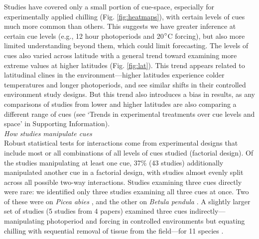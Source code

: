 \documentclass[11pt,letter]{article}
\newcommand{\R}[1]{\label{#1}\linelabel{#1}}
\begin{document}
Studies have covered only a small portion of cue-space, especially for experimentally applied chilling (Fig. \ref{fig:heatmaps}), with certain levels of cues much more common than others. This suggests we have greater inference at certain cue levels (e.g., 12 hour photoperiods and 20$\degree$C forcing), but also more limited understanding beyond them, which could limit forecasting. The levels of cues also varied across latitude with a general trend toward examining more extreme values at higher latitudes (Fig. \ref{fig:lat}). This trend appears related to latitudinal clines in the environment---higher latitudes experience colder temperatures and longer photoperiods, and see similar shifts in their controlled environment study designs. But this trend also introduces a bias in results, as any comparisons of studies from lower and higher latitudes are also comparing a different range of cues (see `Trends in experimental treatments over cue levels and space' in Supporting Information). \\

\emph{How studies manipulate cues}\\ %
\R{R2comm}Robust statistical tests for interactions come from experimental designs that include most or all combinations of all levels of cues studied (factorial design). Of the studies manipulating at least one cue, 37\%  (43 studies) additionally manipulated another cue in a factorial design, with studies almost evenly split across all possible two-way interactions. Studies examining three cues directly were rare: we identified only three studies examining all three cues at once. Two of these were on \emph{Picea abies} \citep{Worrall:1967aa,Sogaard:2008aa}, and the other on \emph{Betula pendula} \citep{Skuterud:1994aa}. A slightly larger set of studies (5 studies from 4 papers) examined three cues indirectly---manipulating photoperiod and forcing in controlled environments but equating chilling with sequential removal of tissue from the field---for 11 species \citep{Schnabel:1987aa,Heide:1993,Partanen:1998aa,Basler:2014aa}. \\
\end{document}
